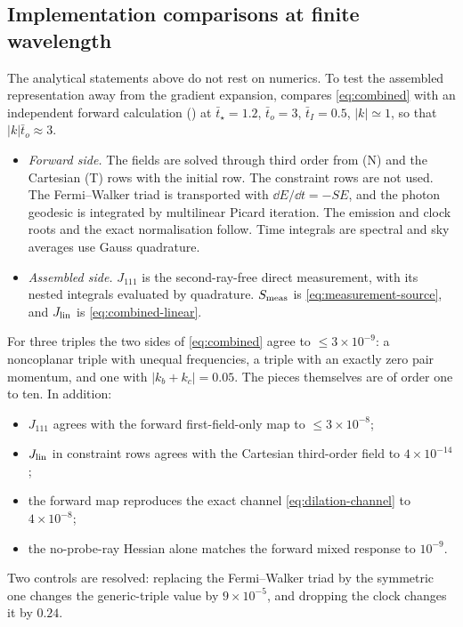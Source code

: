 \subsection{Implementation comparisons at finite wavelength}\label{app:validation}\label{sec:stationary-validation}
The analytical statements above do not rest on numerics. To test the assembled representation
away from the gradient expansion,  compares
\eqref{eq:combined} with an independent forward calculation
() at $\bar t_\star=1.2$, $\bar t_o=3$, $\bar t_I=0.5$,
$|k|\simeq1$, so that $|k|\bar t_o\approx3$.
\begin{itemize}
\item \emph{Forward side.} The fields are solved through third order from (N) and the Cartesian (T)
  rows with the initial row. The constraint rows are not used. The Fermi--Walker triad is
  transported with $\dd E/\dd t=-SE$, and the photon geodesic is integrated by multilinear Picard
  iteration. The emission and clock roots and the exact normalisation follow. Time integrals are
  spectral and sky averages use Gauss quadrature.
\item \emph{Assembled side.} $J_{111}$ is the second-ray-free direct measurement,
  with its nested integrals evaluated by quadrature. $S_{\rm meas}$ is
  \eqref{eq:measurement-source}, and $J_{\rm lin}$ is \eqref{eq:combined-linear}.
\end{itemize}
For three triples the two sides of \eqref{eq:combined} agree to $\le3\times10^{-9}$:
a noncoplanar triple with unequal frequencies, a triple with an exactly zero pair momentum, and
one with $|k_b+k_c|=0.05$. The pieces themselves are of order one to ten. In addition:
\begin{itemize}
\item $J_{111}$ agrees with the forward first-field-only map to $\le3\times10^{-8}$;
\item $J_{\rm lin}$ in constraint rows agrees with the Cartesian third-order field to $4\times10^{-14}$;
\item the forward map reproduces the exact channel \eqref{eq:dilation-channel} to $4\times10^{-8}$;
\item the no-probe-ray Hessian alone matches the forward mixed response to $10^{-9}$.
\end{itemize}
Two controls are resolved: replacing the Fermi--Walker triad by the symmetric one changes the
generic-triple value by $9\times10^{-5}$, and dropping the clock changes it by $0.24$.

